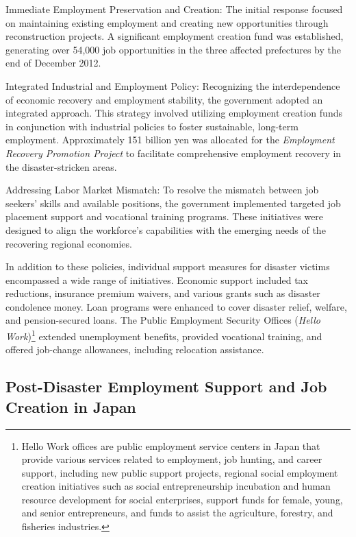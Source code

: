 \documentclass[a4paper,12pt]{article}
\begin{document}
Immediate Employment Preservation and Creation: The initial response focused on maintaining existing employment and creating new opportunities through reconstruction projects. A significant employment creation fund was established, generating over 54,000 job opportunities in the three affected prefectures by the end of December 2012.

Integrated Industrial and Employment Policy: 
Recognizing the interdependence of economic recovery and employment stability, the government adopted an integrated approach. This strategy involved utilizing employment creation funds in conjunction with industrial policies to foster sustainable, long-term employment. Approximately 151 billion yen was allocated for the \textit{Employment Recovery Promotion Project} to facilitate comprehensive employment recovery in the disaster-stricken areas.

Addressing Labor Market Mismatch: To resolve the mismatch between job seekers' skills and available positions, the government implemented targeted job placement support and vocational training programs. These initiatives were designed to align the workforce's capabilities with the emerging needs of the recovering regional economies.

In addition to these policies, individual support measures for disaster victims encompassed a wide range of initiatives. Economic support included tax reductions, insurance premium waivers, and various grants such as disaster condolence money. Loan programs were enhanced to cover disaster relief, welfare, and pension-secured loans. The Public Employment Security Offices (\textit{Hello Work})\footnote{Hello Work offices are public employment service centers in Japan that provide various services related to employment, job hunting, and career support, including new public support projects, regional social employment creation initiatives such as social entrepreneurship incubation and human resource development for social enterprises, support funds for female, young, and senior entrepreneurs, and funds to assist the agriculture, forestry, and fisheries industries.} extended unemployment benefits, provided vocational training, and offered job-change allowances, including relocation assistance.

\subsection{Post-Disaster Employment Support and Job Creation in Japan}
\end{document}
